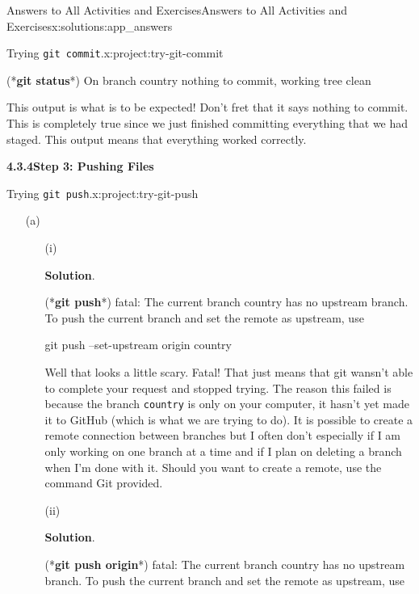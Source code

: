 \documentclass[oneside,10pt,]{book}
\newcommand{\blocktitlefont}{\relax}
\newcommand{\mono}[1]{\texttt{#1}}
\newcommand{\consoleinput}[1]{\textbf{#1}}
\begin{document}
\begin{solutions-chapter}{Answers to All Activities and Exercises}{}{Answers to All Activities and Exercises}{}{}{x:solutions:app_answers}
\begin{projectsolution}{4.6}{Trying \mono{git commit}.}{x:project:try-git-commit}
\begin{enumerate}[font=\bfseries,label=(\alph*),ref=\alph*]
\begin{console}{0}{1}{0}
(*\consoleinput{git status}*)
On branch country
nothing to commit, working tree clean
\end{console}
This output is what is to be expected! Don't fret that it says nothing to commit. This is completely true since we just finished committing everything that we had staged. This output means that everything worked correctly.%
\end{enumerate}
\end{projectsolution}%
\par\medskip
\noindent\textbf{\Large{}4.3.4\space\textperiodcentered\space{}Step 3: Pushing Files}
\begin{projectsolution}{4.7}{Trying \mono{git push}.}{x:project:try-git-push}%
\begin{enumerate}[font=\bfseries,label=(\alph*),ref=\alph*]
\item[(a)]\begin{enumerate}[font=\bfseries,label=(\roman*),ref=\theenumi.\roman*]
\item[(i)]\par\smallskip%
\noindent\textbf{\blocktitlefont Solution}.\hypertarget{g:solution:idm479774552-back}{}\quad{}\begin{console}{0}{1}{0}
(*\consoleinput{git push}*)
fatal: The current branch country has no upstream branch.
To push the current branch and set the remote as upstream, use

    git push --set-upstream origin country
\end{console}
Well that looks a little scary. Fatal! That just means that git wansn't able to complete your request and stopped trying. The reason this failed is because the branch \mono{country} is only on your computer, it hasn't yet made it to GitHub (which is what we are trying to do). It is possible to create a remote connection between branches but I often don't especially if I am only working on one branch at a time and if I plan on deleting a branch when I'm done with it. Should you want to create a remote, use the command Git provided.%
\item[(ii)]\par\smallskip%
\noindent\textbf{\blocktitlefont Solution}.\hypertarget{g:solution:idm479769176-back}{}\quad{}\begin{console}{0}{1}{0}
(*\consoleinput{git push origin}*)
fatal: The current branch country has no upstream branch.
To push the current branch and set the remote as upstream, use


\end{console}
\end{enumerate}
\end{enumerate}
\end{projectsolution}
\end{solutions-chapter}
\end{document}
